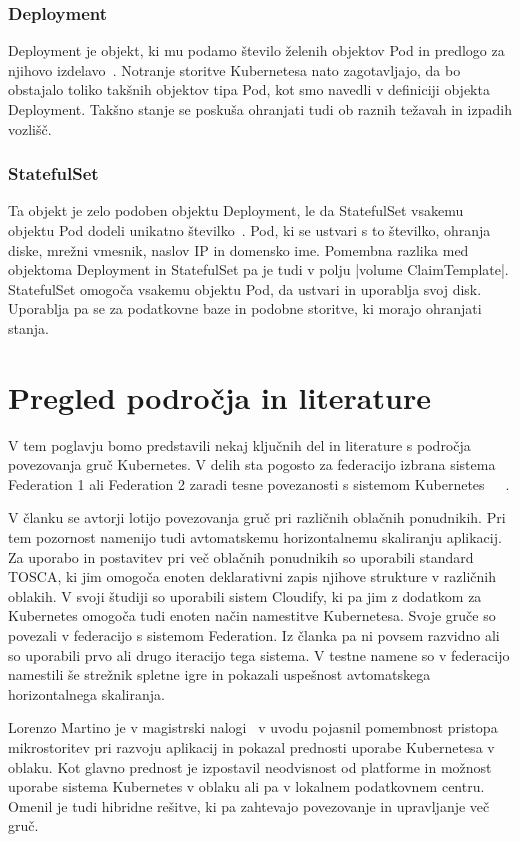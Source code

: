 \documentclass[a4paper, 12pt]{book}
\begin{document}
\subsection{Deployment}
Deployment je objekt, ki mu podamo število želenih objektov Pod in predlogo za njihovo izdelavo~\cite{deployment}.
Notranje storitve Kubernetesa nato zagotavljajo, da bo obstajalo toliko takšnih objektov tipa Pod, kot smo navedli v definiciji objekta Deployment.
Takšno stanje se poskuša ohranjati tudi ob raznih težavah in izpadih vozlišč.
\subsection{StatefulSet}
Ta objekt je zelo podoben objektu Deployment, le da StatefulSet vsakemu objektu Pod dodeli unikatno številko~\cite{statefulset}. 
Pod, ki se ustvari s to številko, ohranja diske, mrežni vmesnik, naslov IP in domensko ime.
Pomembna razlika med objektoma Deployment in StatefulSet pa je tudi v polju \spverb|volume ClaimTemplate|.
StatefulSet omogoča vsakemu objektu Pod, da ustvari in uporablja svoj disk.
Uporablja pa se za podatkovne baze in podobne storitve, ki morajo ohranjati stanja.
\chapter{Pregled področja in literature}
V tem poglavju bomo predstavili nekaj ključnih del in literature s področja povezovanja gruč Kubernetes.
V delih sta pogosto za federacijo izbrana sistema Federation 1 ali Federation 2 zaradi tesne povezanosti s sistemom Kubernetes~\cite{tosca-fed}~\cite{dyn-place}~\cite{kube-and-edge}.

V članku \cite{tosca-fed} se avtorji lotijo povezovanja gruč pri različnih oblačnih ponudnikih.
Pri tem pozornost namenijo tudi avtomatskemu horizontalnemu skaliranju aplikacij.
Za uporabo in postavitev pri več oblačnih ponudnikih so uporabili standard TOSCA, ki jim omogoča enoten deklarativni zapis njihove strukture v različnih oblakih.
V svoji študiji so uporabili sistem Cloudify, ki pa jim z dodatkom za Kubernetes omogoča tudi enoten način namestitve Kubernetesa.
Svoje gruče so povezali v federacijo s sistemom Federation. 
Iz članka pa ni povsem razvidno ali so uporabili prvo ali drugo iteracijo tega sistema.
V testne namene so v federacijo namestili še strežnik spletne igre in pokazali uspešnost avtomatskega horizontalnega skaliranja.

Lorenzo Martino je v magistrski nalogi~\cite{dyn-place} v uvodu pojasnil pomembnost pristopa mikrostoritev pri razvoju aplikacij in pokazal prednosti uporabe Kubernetesa v oblaku.
Kot glavno prednost je izpostavil neodvisnost od platforme in možnost uporabe sistema Kubernetes v oblaku ali pa v lokalnem podatkovnem centru.
Omenil je tudi hibridne rešitve, ki pa zahtevajo povezovanje in upravljanje več gruč.
\end{document}
